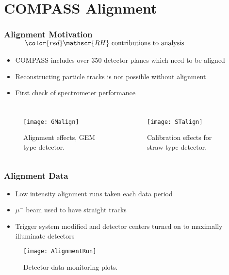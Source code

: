 \ifpdf
\graphicspath{ {Chapters/Alignment/Figs/} }
\section{COMPASS Alignment}

\begin{frame}%
  \frametitle{Alignment Motivation $\qquad \quad \color{red} \mathscr{RH} \text{
      contributions to analysis}$}

  \begin{itemize}
  \item COMPASS includes over 350 detector planes which need to be aligned
  \item Reconstructing particle tracks is not possible without
    alignment
  \item First check of spectrometer performance
  \end{itemize}

  \begin{columns}
    \begin{figure}
      \centering
      \texttt{[image: GMalign]}
      \caption{Alignment effects, GEM type detector.}
    \end{figure}
    \begin{figure}
      \centering
      \texttt{[image: STalign]}
      \caption{Calibration effects for straw type detector.}
    \end{figure}
  \end{columns}
\end{frame}


\begin{frame}
  \frametitle{Alignment Data}

  \begin{itemize}
  \item Low intensity alignment runs taken each data period
  \item $\mu^-$ beam used to have straight tracks
  \item Trigger system modified and detector centers turned on to
    maximally illuminate detectors
  \end{itemize}

  \begin{figure}
    \centering
    \texttt{[image: AlignmentRun]}
    \caption{Detector data monitoring plots.}
  \end{figure}
\end{frame}


